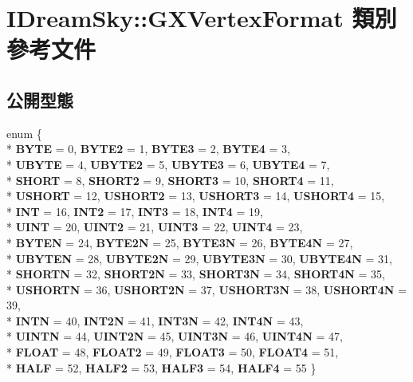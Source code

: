 \hypertarget{class_i_dream_sky_1_1_g_x_vertex_format}{}\section{I\+Dream\+Sky\+:\+:G\+X\+Vertex\+Format 類別 參考文件}
\label{class_i_dream_sky_1_1_g_x_vertex_format}
\subsection*{公開型態}
\begin{DoxyCompactItemize}
\item 
enum \{ \\*
{\bfseries B\+Y\+TE} = 0, 
{\bfseries B\+Y\+T\+E2} = 1, 
{\bfseries B\+Y\+T\+E3} = 2, 
{\bfseries B\+Y\+T\+E4} = 3, 
\\*
{\bfseries U\+B\+Y\+TE} = 4, 
{\bfseries U\+B\+Y\+T\+E2} = 5, 
{\bfseries U\+B\+Y\+T\+E3} = 6, 
{\bfseries U\+B\+Y\+T\+E4} = 7, 
\\*
{\bfseries S\+H\+O\+RT} = 8, 
{\bfseries S\+H\+O\+R\+T2} = 9, 
{\bfseries S\+H\+O\+R\+T3} = 10, 
{\bfseries S\+H\+O\+R\+T4} = 11, 
\\*
{\bfseries U\+S\+H\+O\+RT} = 12, 
{\bfseries U\+S\+H\+O\+R\+T2} = 13, 
{\bfseries U\+S\+H\+O\+R\+T3} = 14, 
{\bfseries U\+S\+H\+O\+R\+T4} = 15, 
\\*
{\bfseries I\+NT} = 16, 
{\bfseries I\+N\+T2} = 17, 
{\bfseries I\+N\+T3} = 18, 
{\bfseries I\+N\+T4} = 19, 
\\*
{\bfseries U\+I\+NT} = 20, 
{\bfseries U\+I\+N\+T2} = 21, 
{\bfseries U\+I\+N\+T3} = 22, 
{\bfseries U\+I\+N\+T4} = 23, 
\\*
{\bfseries B\+Y\+T\+EN} = 24, 
{\bfseries B\+Y\+T\+E2N} = 25, 
{\bfseries B\+Y\+T\+E3N} = 26, 
{\bfseries B\+Y\+T\+E4N} = 27, 
\\*
{\bfseries U\+B\+Y\+T\+EN} = 28, 
{\bfseries U\+B\+Y\+T\+E2N} = 29, 
{\bfseries U\+B\+Y\+T\+E3N} = 30, 
{\bfseries U\+B\+Y\+T\+E4N} = 31, 
\\*
{\bfseries S\+H\+O\+R\+TN} = 32, 
{\bfseries S\+H\+O\+R\+T2N} = 33, 
{\bfseries S\+H\+O\+R\+T3N} = 34, 
{\bfseries S\+H\+O\+R\+T4N} = 35, 
\\*
{\bfseries U\+S\+H\+O\+R\+TN} = 36, 
{\bfseries U\+S\+H\+O\+R\+T2N} = 37, 
{\bfseries U\+S\+H\+O\+R\+T3N} = 38, 
{\bfseries U\+S\+H\+O\+R\+T4N} = 39, 
\\*
{\bfseries I\+N\+TN} = 40, 
{\bfseries I\+N\+T2N} = 41, 
{\bfseries I\+N\+T3N} = 42, 
{\bfseries I\+N\+T4N} = 43, 
\\*
{\bfseries U\+I\+N\+TN} = 44, 
{\bfseries U\+I\+N\+T2N} = 45, 
{\bfseries U\+I\+N\+T3N} = 46, 
{\bfseries U\+I\+N\+T4N} = 47, 
\\*
{\bfseries F\+L\+O\+AT} = 48, 
{\bfseries F\+L\+O\+A\+T2} = 49, 
{\bfseries F\+L\+O\+A\+T3} = 50, 
{\bfseries F\+L\+O\+A\+T4} = 51, 
\\*
{\bfseries H\+A\+LF} = 52, 
{\bfseries H\+A\+L\+F2} = 53, 
{\bfseries H\+A\+L\+F3} = 54, 
{\bfseries H\+A\+L\+F4} = 55
 \}\hypertarget{class_i_dream_sky_1_1_g_x_vertex_format_a1443a46b3efe40b9380ee9a27f695745}{}\label{class_i_dream_sky_1_1_g_x_vertex_format_a1443a46b3efe40b9380ee9a27f695745}


\end{DoxyCompactItemize}
